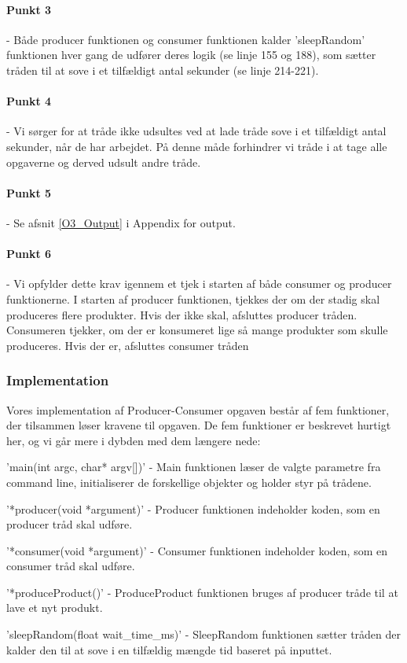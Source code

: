 {\paragraph{Punkt 3} - Både producer funktionen og consumer funktionen kalder 'sleepRandom' funktionen hver gang de udfører deres logik (se linje 155 og 188), som sætter tråden til at sove i et tilfældigt antal sekunder (se linje 214-221).
\paragraph{Punkt 4} - Vi sørger for at tråde ikke udsultes ved at lade tråde sove i et tilfældigt antal sekunder, når de har arbejdet. På denne måde forhindrer vi tråde i at tage alle opgaverne og derved udsult andre tråde.
\paragraph{Punkt 5} - Se afsnit \ref{O3_Output} i Appendix for output.
\paragraph{Punkt 6} - Vi opfylder dette krav igennem et tjek i starten af både consumer og producer funktionerne. I starten af producer funktionen, tjekkes der om der stadig skal produceres flere produkter. Hvis der ikke skal, afsluttes producer tråden. Consumeren tjekker, om der er konsumeret lige så mange produkter som skulle produceres. Hvis der er, afsluttes consumer tråden

\subsubsection{Implementation}
\label{O3_Implementation}
Vores implementation af Producer-Consumer opgaven består af fem funktioner, der tilsammen løser kravene til opgaven. De fem funktioner er beskrevet hurtigt her, og vi går mere i dybden med dem længere nede: 
\begin{my_enumerate}
    \item 'main(int argc, char* argv[])' - Main funktionen læser de valgte parametre fra command line, initialiserer de forskellige objekter og holder styr på trådene.
    \item '*producer(void *argument)' - Producer funktionen indeholder koden, som en producer tråd skal udføre. 
    \item '*consumer(void *argument)' - Consumer funktionen indeholder koden, som en consumer tråd skal udføre. 
    \item '*produceProduct()' - ProduceProduct funktionen bruges af producer tråde til at lave et nyt produkt.
    \item 'sleepRandom(float wait_time_ms)' - SleepRandom funktionen sætter tråden der kalder den til at sove i en tilfældig mængde tid baseret på inputtet.
\end{my_enumerate}

}
